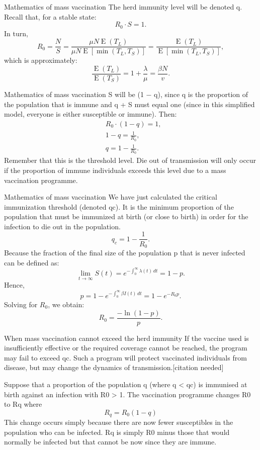 \documentclass[
  notheorems,
  aspectratio=54,
]{beamer}
\begin{document}
\begin{frame}{Mathematics of mass vaccination}
  The herd immunity level will be denoted q. Recall that, for a stable state:
$${\displaystyle R_{0}\cdot S=1.}$$
In turn,
$${\displaystyle R_{0}={\frac {N}{S}}={\frac {\mu N\operatorname {E} (T_{L})}{\mu N\operatorname {E} [\min(T_{L},T_{S})]}}={\frac {\operatorname {E} (T_{L})}{\operatorname {E} [\min(T_{L},T_{S})]}},}$$
which is approximately:
$${\displaystyle {\frac {\operatorname {\operatorname {E} } (T_{L})}{\operatorname {\operatorname {E} } (T_{S})}}=1+{\frac {\lambda }{\mu }}={\frac {\beta N}{v}}.}$$
\end{frame}

\begin{frame}{Mathematics of mass vaccination}
S will be (1 − q), since q is the proportion of the population that is immune and q + S must equal one (since in this simplified model, everyone is either susceptible or immune). Then:
$${\displaystyle {\begin{aligned}&R_{0}\cdot (1-q)=1,\\[6pt]&1-q={\frac {1}{R_{0}}},\\[6pt]&q=1-{\frac {1}{R_{0}}}.\end{aligned}}}$$
  Remember that this is the threshold level. Die out of transmission will only occur if the proportion of immune individuals exceeds this level due to a mass vaccination programme.
\end{frame}

\begin{frame}{Mathematics of mass vaccination}
  We have just calculated the critical immunization threshold (denoted qc). It is the minimum proportion of the population that must be immunized at birth (or close to birth) in order for the infection to die out in the population.
$${\displaystyle q_{c}=1-{\frac {1}{R_{0}}}.}$$
Because the fraction of the final size of the population p that is never infected can be defined as:
$${\displaystyle \lim _{t\to \infty }S(t)=e^{-\int _{0}^{\infty }\lambda (t)\,dt}=1-p.}$$
Hence,
$${\displaystyle p=1-e^{-\int _{0}^{\infty }\beta I(t)\,dt}=1-e^{-R_{0}p}.}$$
Solving for 
${\displaystyle R_{0}}$, we obtain:
$${\displaystyle R_{0}={\frac {-\ln(1-p)}{p}}.}$$
\end{frame}

\begin{frame}{When mass vaccination cannot exceed the herd immunity}
  If the vaccine used is insufficiently effective or the required coverage cannot be reached, the program may fail to exceed qc. Such a program will protect vaccinated individuals from disease, but may change the dynamics of transmission.[citation needed]

Suppose that a proportion of the population q (where q < qc) is immunised at birth against an infection with R0 > 1. The vaccination programme changes R0 to Rq where
$${\displaystyle R_{q}=R_{0}(1-q)}$$
This change occurs simply because there are now fewer susceptibles in the population who can be infected. Rq is simply R0 minus those that would normally be infected but that cannot be now since they are immune.
\end{frame}
\end{document}
